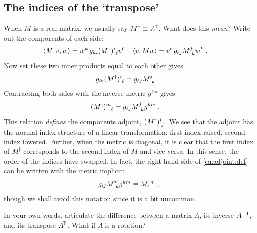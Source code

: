 \documentclass[12pt, oneside]{report}    %
\begin{document}
\subsection{The indices of the `transpose'}
When $M$ is a real matrix, we usually say $M^\dag \equiv A^{\mkern-1.5mu\mathsf{T}}$. What does this \emph{mean}? Write out the components of each side:
\begin{align}
    \la M^\dag v, w \ra
    &=
   w^k \, g_{ki}  (M^\dag)\aij{i}{\ell} v^\ell  \,  
    &
    \la  v,M w \ra
    &=
   v^\ell\, g_{\ell j}  M\aij{j}{k} w^k  
   \ .
   \label{eq:adjoint:transpose:int1}
\end{align}
Now set these two inner products equal to each other gives
\begin{align}
    g_{ki}(M^\dag)\aij{i}{\ell}
    &=
    g_{\ell j} M\aij{j}{k}
    \label{eq:adjoint:transpose:int2}
\end{align}
Contracting both sides with the inverse metric $g^{km}$ gives
\begin{align}
    (M^\dag)\aij{m}{\ell} &= g_{\ell j} M\aij{j}{k} g^{km} \ .
    \label{eq:adjoint:def}
\end{align}
This relation \emph{defines} the components adjoint, $(M^\dag)\aij{i}{j}$. We see that the adjoint has the normal index structure of a linear transformation: first index raised, second index lowered. Further, when the metric is diagonal, it is clear that the first index of $M^\dag$ corresponds to the second index of $M$ and vice  versa. In this sense, the order of the indices have swapped.  In fact, the right-hand side of  \eqref{eq:adjoint:def} can be written with the metric implicit:
\begin{align}
    g_{\ell j} M\aij{j}{k} g^{km} \equiv 
    M_\ell^{\phantom{\ell}m} \ ,
\end{align}
though we shall avoid this notation since it is a bit uncommon.



\begin{exercise}
In your own words, articulate the difference between a matrix $A$, its inverse $A^{-1}$, and its transpose $A^{\mkern-1.5mu\mathsf{T}}$. What if $A$ is a rotation?
\end{exercise}
\end{document}
